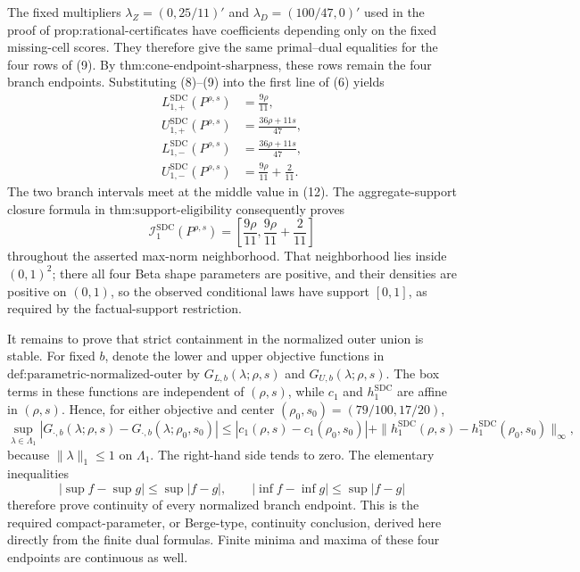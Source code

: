The fixed multipliers \(\lambda_Z=(0,25/11)'\) and \(\lambda_D=(100/47,0)'\) used in the proof of \(\text{prop:rational-certificates}\) have coefficients depending only on the fixed missing-cell scores.  They therefore give the same primal--dual equalities for the four rows of (9).  By \(\text{thm:cone-endpoint-sharpness}\), these rows remain the four branch endpoints.  Substituting (8)--(9) into the first line of (6) yields
\[
 \begin{aligned}
 L_{1,+}^{\mathrm{SDC}}(P^{\rho,s})&=\frac{9\rho}{11},\\
 U_{1,+}^{\mathrm{SDC}}(P^{\rho,s})&=\frac{36\rho+11s}{47},\\
 L_{1,-}^{\mathrm{SDC}}(P^{\rho,s})&=\frac{36\rho+11s}{47},\\
 U_{1,-}^{\mathrm{SDC}}(P^{\rho,s})&=\frac{9\rho}{11}+\frac{2}{11}.
 \end{aligned} \tag{12}
\]
The two branch intervals meet at the middle value in (12).  The aggregate-support closure formula in \(\text{thm:support-eligibility}\) consequently proves
\[
 \mathcal I_1^{\mathrm{SDC}}(P^{\rho,s})
 =\left[\frac{9\rho}{11},\frac{9\rho}{11}+\frac{2}{11}\right] \tag{13}
\]
throughout the asserted max-norm neighborhood.  That neighborhood lies inside \((0,1)^2\); there all four Beta shape parameters are positive, and their densities are positive on \((0,1)\), so the observed conditional laws have support \([0,1]\), as required by the factual-support restriction.

It remains to prove that strict containment in the normalized outer union is stable.  For fixed \(b\), denote the lower and upper objective functions in \(\text{def:parametric-normalized-outer}\) by \(G_{L,b}(\lambda;\rho,s)\) and \(G_{U,b}(\lambda;\rho,s)\).  The box terms in these functions are independent of \((\rho,s)\), while \(c_1\) and \(h_1^{\mathrm{SDC}}\) are affine in \((\rho,s)\).  Hence, for either objective and center \((\rho_0,s_0)=(79/100,17/20)\),
\[
 \sup_{\lambda\in\Lambda_1}
 \left|G_{\cdot,b}(\lambda;\rho,s)-G_{\cdot,b}(\lambda;\rho_0,s_0)\right|
 \leq |c_1(\rho,s)-c_1(\rho_0,s_0)|
      +\|h_1^{\mathrm{SDC}}(\rho,s)-h_1^{\mathrm{SDC}}(\rho_0,s_0)\|_\infty,
 \tag{14}
\]
because \(\|\lambda\|_1\leq1\) on \(\Lambda_1\).  The right-hand side tends to zero.  The elementary inequalities
\[
 \left|\sup f-\sup g\right|\leq\sup|f-g|,
 \qquad
 \left|\inf f-\inf g\right|\leq\sup|f-g| \tag{15}
\]
therefore prove continuity of every normalized branch endpoint.  This is the required compact-parameter, or Berge-type, continuity conclusion, derived here directly from the finite dual formulas.  Finite minima and maxima of these four endpoints are continuous as well.

